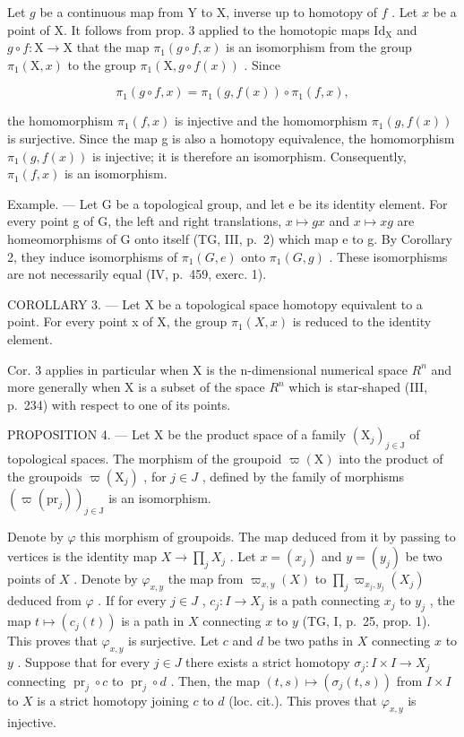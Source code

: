 Let \(g\) be a continuous map from Y to X, inverse up to homotopy of \(f\) . Let \(x\) be a point of X. It follows from prop. 3 applied to the homotopic maps \(\mathrm{Id}_{\mathrm{X}}\) and \(g \circ f: \mathrm{X} \to \mathrm{X}\) that the map \(\pi_1(g \circ f, x)\) is an isomorphism from the group \(\pi_1(\mathrm{X}, x)\) to the group \(\pi_1(\mathrm{X}, g \circ f(x))\) . Since

\[
\pi_ {1} (g \circ f, x) = \pi_ {1} (g, f (x)) \circ \pi_ {1} (f, x),
\]

the homomorphism \(\pi_{1}(f,x)\) is injective and the homomorphism \(\pi_{1}(g,f(x))\) is surjective. Since the map g is also a homotopy equivalence, the homomorphism \(\pi_{1}(g,f(x))\) is injective; it is therefore an isomorphism. Consequently, \(\pi_{1}(f,x)\) is an isomorphism.

Example. --- Let G be a topological group, and let e be its identity element. For every point g of G, the left and right translations, \(x \mapsto gx\) and \(x \mapsto xg\) are homeomorphisms of G onto itself (TG, III, p.~2) which map e to g. By Corollary 2, they induce isomorphisms of \(\pi_{1}(G, e)\) onto \(\pi_{1}(G, g)\) . These isomorphisms are not necessarily equal (IV, p.~459, exerc. 1).

COROLLARY 3. --- Let X be a topological space homotopy equivalent to a point. For every point x of X, the group \(\pi_{1}(X,x)\) is reduced to the identity element.

Cor. 3 applies in particular when X is the n-dimensional numerical space \(R^{n}\) and more generally when X is a subset of the space \(R^{n}\) which is star-shaped (III, p.~234) with respect to one of its points.

PROPOSITION 4. --- Let X be the product space of a family \((\mathrm{X}_{j})_{j\in\mathrm{J}}\) of topological spaces. The morphism of the groupoid \(\varpi(\mathrm{X})\) into the product of the groupoids \(\varpi(\mathrm{X}_{j})\) , for \(j\in J\) , defined by the family of morphisms \((\varpi(\mathrm{pr}_{j}))_{j\in\mathrm{J}}\) is an isomorphism.

Denote by \(\varphi\) this morphism of groupoids. The map deduced from it by passing to vertices is the identity map \(X \to \prod_{j} X_{j}\) . Let \(x = (x_{j})\) and \(y = (y_{j})\) be two points of \(X\) . Denote by \(\varphi_{x,y}\) the map from \(\varpi_{x,y}(X)\) to \(\prod_{j} \varpi_{x_{j},y_{j}}(X_{j})\) deduced from \(\varphi\) . If for every \(j \in J\) , \(c_{j}: I \to X_{j}\) is a path connecting \(x_{j}\) to \(y_{j}\) , the map \(t \mapsto (c_{j}(t))\) is a path in \(X\) connecting \(x\) to \(y\) (TG, I, p.~25, prop. 1). This proves that \(\varphi_{x,y}\) is surjective. Let \(c\) and \(d\) be two paths in \(X\) connecting \(x\) to \(y\) . Suppose that for every \(j \in J\) there exists a strict homotopy \(\sigma_{j}: I \times I \to X_{j}\) connecting \(\operatorname{pr}_{j} \circ c\) to \(\operatorname{pr}_{j} \circ d\) . Then, the map \((t,s) \mapsto (\sigma_{j}(t,s))\) from \(I \times I\) to \(X\) is a strict homotopy joining \(c\) to \(d\) (loc. cit.). This proves that \(\varphi_{x,y}\) is injective.

